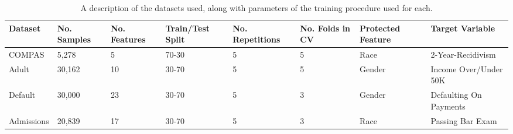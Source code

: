 \begin{table*}[t]
\centering
\caption{A description of the datasets used, along with parameters of the training procedure used for each.}
\label{table:datasets_description}
\begin{adjustbox}{max width=\textwidth}
\begin{tabular}{|l|l|l|l|l|l|l|l|}
\hline
\textbf{Dataset} & \textbf{No. Samples} & \textbf{No. Features} & \textbf{Train/Test Split} & \textbf{No. Repetitions} & \textbf{No. Folds in CV} & \textbf{Protected Feature} & \textbf{Target Variable} \\ \hline
COMPAS           & 5,278                     & 5                          & 70-30                     & 5                        & 5                                 & Race                       & 2-Year-Recidivism        \\ \hline
Adult            & 30,162                    & 10                         & 30-70                     & 5                        & 5                                 & Gender                     & Income Over/Under 50K    \\ \hline
Default          & 30,000                    & 23                         & 30-70                     & 5                        & 3                                 & Gender                     & Defaulting On Payments   \\ \hline
Admissions       & 20,839                    & 17                         & 30-70                     & 5                        & 3                                 & Race                       & Passing Bar Exam         \\ \hline
\end{tabular}
\end{adjustbox}
\end{table*}


